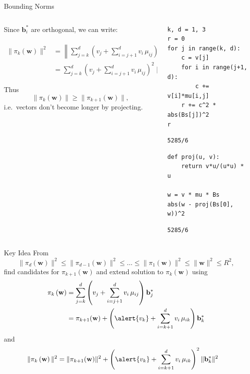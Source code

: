\documentclass[presentation,smaller]{beamer}
\renewcommand{\vec}[1]{\mathbf{#1}\xspace}
\begin{document}
\begin{frame}[fragile,label={sec:org20e2502}]{Bounding Norms}
 \begin{columns}[t]
\begin{column}{0.6\columnwidth}
Since \(\vec{b}_i^*\) are orthogonal, we can write:

\begin{align*}
\|π_k\left(\vec{w}\right)\|^2 &= \left\|\sum_{j=k}^{d} \left(v_j  + \sum_{i=j+1}^{d} v_i\, \mu_{ij} \right) \vec{b}_j^*\right\|^2\\
&= \sum_{j=k}^{d} \left(v_j  + \sum_{i=j+1}^{d} v_i\, \mu_{ij} \right)^2 \|\vec{b}_j^*\|^2
\end{align*}



Thus \[\|π_{k}(\vec{w})\| ≥ \|π_{k+1}(\vec{w})\|,\] i.e. vectors don’t become longer by projecting.
\end{column}

\begin{column}{0.4\columnwidth}
\lstset{language=sage,label= ,caption= ,captionpos=b,numbers=none}
\begin{lstlisting}
k, d = 1, 3
r = 0
for j in range(k, d):
    c = v[j]
    for i in range(j+1, d):
        c += v[i]*mu[i,j]
    r += c^2 * abs(Bs[j])^2
r
\end{lstlisting}

\begin{verbatim}
5285/6
\end{verbatim}

\lstset{language=sage,label= ,caption= ,captionpos=b,numbers=none}
\begin{lstlisting}
def proj(u, v):
    return v*u/(u*u) * u

w = v * mu * Bs
abs(w - proj(Bs[0], w))^2
\end{lstlisting}

\begin{verbatim}
5285/6
\end{verbatim}
\end{column}
\end{columns}
\end{frame}

\begin{frame}[label={sec:orga3fbd51}]{Key Idea}
From \[\|π_{d}(\vec{w})\|^2 \leq \|π_{d-1}(\vec{w})\|^2 ≤ … ≤ \|π_{1}(\vec{w})\|^2 ≤ \|\vec{w}\|^2 \leq R^2,\] find candidates for \(π_{k+1}(\vec{w})\) and extend solution to \(π_{k}(\vec{w})\) using
\begin{align*}
\pi_k\left(\vec{w}\right) &= \sum_{j=k}^{d} \left(v_j  + \sum_{i=j+1}^{d} v_i\, \mu_{ij} \right) \vec{b}_j^*\\
&=  \pi_{k+1}(\vec{w}) + \left(\alert{v_k}  + \sum_{i=k+1}^{d} v_i\, \mu_{ik} \right) \vec{b}_k^*
\end{align*}
and
\begin{align*}
\|\pi_k\left(\vec{w}\right)\|^2 
&=  \|\pi_{k+1}(\vec{w})\|^2 + \left(\alert{v_k}  + \sum_{i=k+1}^{d} v_i\, \mu_{ik} \right)^2 \|\vec{b}_k^*\|^2
\end{align*}
\end{frame}
\end{document}
